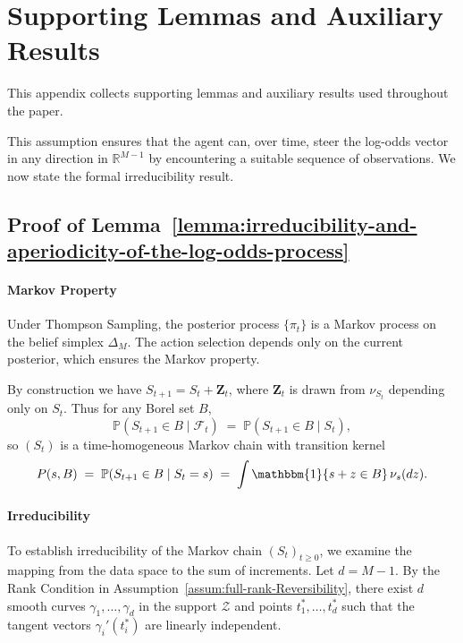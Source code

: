 \documentclass[12pt]{article}
\begin{document}
\section{Supporting Lemmas and Auxiliary Results}
\label{app:E}

This appendix collects supporting lemmas and auxiliary results used throughout the paper.


This assumption ensures that the agent can, over time, steer the log-odds vector in any direction in $\mathbb{R}^{M-1}$ by encountering a suitable sequence of observations. We now state the formal irreducibility result.


\subsection{Proof of Lemma~\ref{lemma:irreducibility-and-aperiodicity-of-the-log-odds-process}}
\label{app:A:markov}

\paragraph{Markov Property} Under Thompson Sampling, the posterior process $\{\pi_t\}$ is a Markov process on the belief simplex $\Delta_M$. The action selection depends only on the current posterior, which ensures the Markov property.

By construction we have $S_{t+1}=S_t+\mathbf{Z}_t$, where $\mathbf{Z}_t$ is drawn from $\nu_{S_t}$ depending only on $S_t$. Thus for any Borel set $B$,
\[
    \mathbb{P}(S_{t+1}\in B \mid \mathcal{F}_t) \;=\; \mathbb{P}(S_{t+1}\in B \mid S_t),
\]
so $(S_t)$ is a time-homogeneous Markov chain with transition kernel
\begin{equation}
    P(s,B) \;=\; \mathbb{P}(S_{t+1}\in B \mid S_t = s) \;=\; \int \mathbbm{1}\{s+z \in B\}\,\nu_s(dz).\label{eq:transition-kernel}
\end{equation}

\paragraph{Irreducibility} 


To establish  irreducibility of the Markov chain $(S_t)_{t\geq 0}$, we examine the mapping from the data space to the sum of increments. Let $d = M-1$. By the Rank Condition in Assumption~\ref{assum:full-rank-Reversibility}, there exist $d$ smooth curves $\gamma_1, \dots, \gamma_d$ in the support $\mathcal{Z}$ and points $t_1^*, \dots, t_d^*$ such that the tangent vectors $\gamma_i'(t_i^*)$ are linearly independent.
\end{document}
